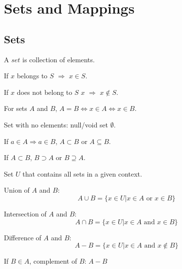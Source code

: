 \chapter{Sets and Mappings}

\section{Sets}
\begin{definition}[set]
  A $set$ is collection of elements.
\end{definition}
\begin{definition}[belongs to]
  If $x$ belongs to $S$ $\Rightarrow$ $x \in S$.
\end{definition}
\begin{definition}
  If $x$ does not belong to $S$ $x$ $\Rightarrow$ $x \notin S$.
\end{definition}
\begin{definition}
  For sets $A$ and $B$, $A = B \Leftrightarrow x \in A \Leftrightarrow x \in B$.
\end{definition}
\begin{definition}
  Set with no elements: null/void set $\emptyset$.
\end{definition}
\begin{definition}[subset]
  If $a \in A \Rightarrow a \in B$, $A \subset B$ or $A \subseteq B$.
\end{definition}
\begin{definition}[superset]
  If $A \subset B$, $B \supset A$ or $B \supseteq A$.
\end{definition}
\begin{definition}
  Set $U$ that contains all sets in a given context.
\end{definition}
\begin{definition}[union]
  Union of $A$ and $B$: \[A \cup B = \{x \in U | x \in A \text{ or } x \in B\}\]
\end{definition}
\begin{definition}[intersection]
Intersection of $A$ and $B$: \[A \cap B = \{x \in U | x \in A \text{ and } x \in B\}\]
\end{definition}
\begin{definition}[difference]
  Difference of $A$ and $B$: \[A - B = \{x \in U | x \in A \text{ and } x \notin B\}\]
\end{definition}
\begin{definition}[complement]
  If $B \in A$, complement of $B$: $A - B$
\end{definition}
